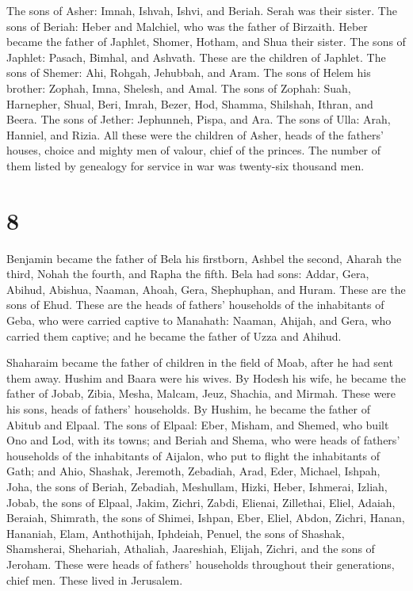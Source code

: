  The sons of Asher: Imnah, Ishvah, Ishvi, and Beriah. Serah
was their sister.  The sons of Beriah: Heber and Malchiel,
who was the father of Birzaith.  Heber became the father of
Japhlet, Shomer, Hotham, and Shua their sister.  The sons
of Japhlet: Pasach, Bimhal, and Ashvath. These are the children of
Japhlet.  The sons of Shemer: Ahi, Rohgah, Jehubbah, and
Aram.  The sons of Helem his brother: Zophah, Imna,
Shelesh, and Amal.  The sons of Zophah: Suah, Harnepher,
Shual, Beri, Imrah,  Bezer, Hod, Shamma, Shilshah, Ithran,
and Beera.  The sons of Jether: Jephunneh, Pispa, and Ara.
 The sons of Ulla: Arah, Hanniel, and Rizia. 
All these were the children of Asher, heads of the fathers' houses,
choice and mighty men of valour, chief of the princes. The number of
them listed by genealogy for service in war was twenty-six thousand men.

\hypertarget{section-7}{%
\section{8}\label{section-7}}

 Benjamin became the father of Bela his firstborn, Ashbel
the second, Aharah the third,  Nohah the fourth, and Rapha
the fifth.  Bela had sons: Addar, Gera, Abihud, 
Abishua, Naaman, Ahoah,  Gera, Shephuphan, and Huram.
 These are the sons of Ehud. These are the heads of fathers'
households of the inhabitants of Geba, who were carried captive to
Manahath:  Naaman, Ahijah, and Gera, who carried them
captive; and he became the father of Uzza and Ahihud.

 Shaharaim became the father of children in the field of
Moab, after he had sent them away. Hushim and Baara were his wives.
 By Hodesh his wife, he became the father of Jobab, Zibia,
Mesha, Malcam,  Jeuz, Shachia, and Mirmah. These were his
sons, heads of fathers' households.  By Hushim, he became
the father of Abitub and Elpaal.  The sons of Elpaal: Eber,
Misham, and Shemed, who built Ono and Lod, with its towns; 
and Beriah and Shema, who were heads of fathers' households of the
inhabitants of Aijalon, who put to flight the inhabitants of Gath;
 and Ahio, Shashak, Jeremoth,  Zebadiah, Arad,
Eder,  Michael, Ishpah, Joha, the sons of Beriah,
 Zebadiah, Meshullam, Hizki, Heber,  Ishmerai,
Izliah, Jobab, the sons of Elpaal,  Jakim, Zichri, Zabdi,
 Elienai, Zillethai, Eliel,  Adaiah, Beraiah,
Shimrath, the sons of Shimei,  Ishpan, Eber, Eliel,
 Abdon, Zichri, Hanan,  Hananiah, Elam,
Anthothijah,  Iphdeiah, Penuel, the sons of Shashak,
 Shamsherai, Shehariah, Athaliah,  Jaareshiah,
Elijah, Zichri, and the sons of Jeroham.  These were heads
of fathers' households throughout their generations, chief men. These
lived in Jerusalem.

